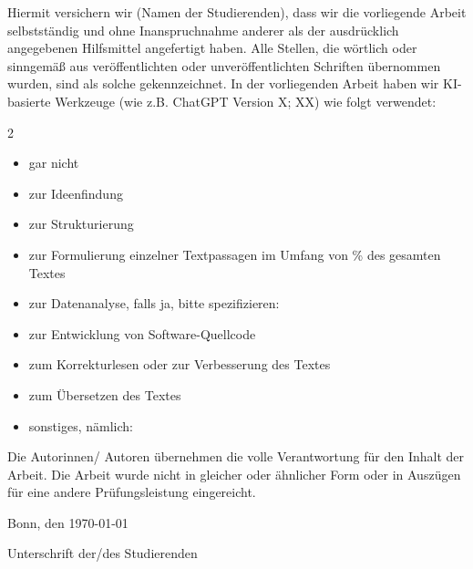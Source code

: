 \documentclass[a4paper,12pt]{article}
\begin{document}
Hiermit versichern wir (Namen der Studierenden), dass wir die vorliegende Arbeit selbstständig und ohne Inanspruchnahme anderer als der
ausdrücklich angegebenen Hilfsmittel angefertigt haben. Alle Stellen, die wörtlich oder
sinngemäß aus veröffentlichten oder unveröffentlichten Schriften übernommen wurden, sind
als solche gekennzeichnet.
In der vorliegenden Arbeit haben wir KI-basierte Werkzeuge (wie z.B. ChatGPT Version X;
XX) wie folgt verwendet: 
\par \vspace*{4mm}
\begin{multicols}{2}

\begin{itemize}
\item[$\square$] gar nicht
\item zur Ideenfindung
\item zur Strukturierung
\item zur Formulierung einzelner Textpassagen im Umfang von \underline{\hspace*{5mm}}\% des gesamten Textes
\item zur Datenanalyse, falls ja, bitte spezifizieren:
\item zur Entwicklung von Software-Quellcode
\item zum Korrekturlesen oder zur Verbesserung des Textes
\item zum Übersetzen des Textes
\item sonstiges, nämlich:\underline{\hspace*{10mm}}
\end{itemize}
\end{multicols}
\par \vspace*{4mm}
Die Autorinnen/ Autoren übernehmen die volle Verantwortung für den Inhalt der Arbeit. Die
Arbeit wurde nicht in gleicher oder ähnlicher Form oder in Auszügen für eine andere
Prüfungsleistung eingereicht.

\vspace*{4mm}
Bonn, den \today
\par \vspace*{10mm}
 
Unterschrift der/des Studierenden 
\end{document}
